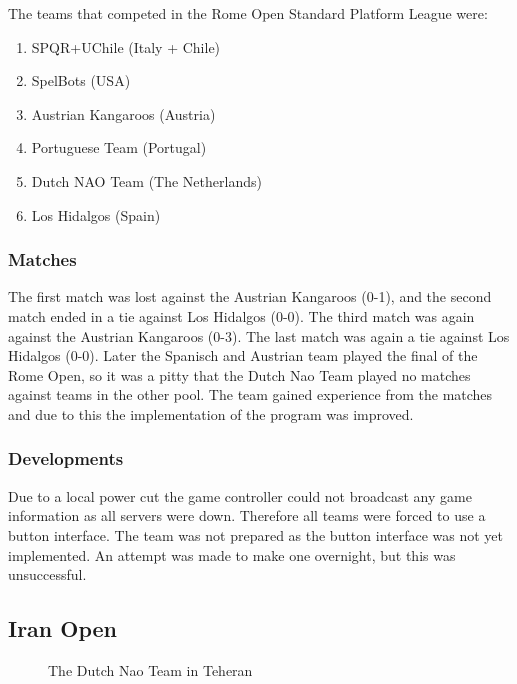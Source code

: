 \documentclass[11pt,a4paper,oneside]{article}
\begin{document}
The teams that competed in the Rome Open Standard Platform League were:
\begin{enumerate}
\item SPQR+UChile (Italy + Chile)
\item SpelBots (USA)
\item Austrian Kangaroos (Austria)
\item Portuguese Team (Portugal)
\item Dutch NAO Team (The Netherlands)
\item Los Hidalgos (Spain)
\end{enumerate}

\subsubsection{Matches}
The first match was lost against the Austrian Kangaroos (0-1), and the second match ended in a tie against Los Hidalgos (0-0). The third match was again against the Austrian Kangaroos (0-3). The last match was again a tie against Los Hidalgos (0-0).
Later the Spanisch and Austrian team played the final of the Rome Open, so it was a pitty that the Dutch Nao Team played no matches against teams in the other pool. 
The team gained experience from the matches and due to this the implementation of the program was improved.

\subsubsection{Developments}
Due to a local power cut the game controller could not broadcast any game information as all servers were down. Therefore all teams were forced to use a button interface. The team was not prepared as the button interface was not yet implemented. An attempt was made to make one overnight, but this was unsuccessful.

\subsection{Iran Open}
\begin{figure}[htb]    	
\centering
{}
\caption{The Dutch Nao Team in Teheran}
\label{fig:TeamPhotoTeheran}
\end{figure}
\end{document}
